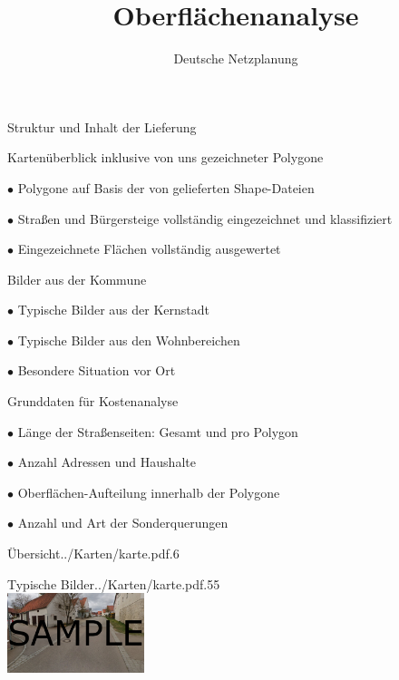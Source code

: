 \documentclass[11pt, dvipsnames,aspectratio=169]{beamer}
\author[DNP]{Deutsche Netzplanung}
\title[Oberflächenanalyse \Ort{} (\Kreis, \Land)]{\textbf{Oberflächenanalyse} \\ \Ort}
\date{\Abgabedatum}
\begin{document}
{
	\maketitle
}

\begin{frame}{Struktur und Inhalt der Lieferung \Ort}
	\begin{bulletlist}{5pt}
		\item Kartenüberblick inklusive von uns gezeichneter Polygone
			\begin{bulletlist}{3pt}
				\item[$\bullet$] Polygone auf Basis der von \Kunde{} gelieferten Shape-Dateien
				\item[$\bullet$] Straßen und Bürgersteige vollständig eingezeichnet und klassifiziert
				\item[$\bullet$] Eingezeichnete Flächen vollständig ausgewertet
			\end{bulletlist}
		\item Bilder aus der Kommune
		\begin{bulletlist}{3pt}
			\item[$\bullet$] Typische Bilder aus der Kernstadt
			\item[$\bullet$] Typische Bilder aus den Wohnbereichen
			\item[$\bullet$] Besondere Situation vor Ort
		\end{bulletlist}
		\item Grunddaten für Kostenanalyse
		\begin{bulletlist}{3pt}
			\item[$\bullet$] Länge der Straßenseiten: Gesamt und pro Polygon
			\item[$\bullet$] Anzahl Adressen und Haushalte
			\item[$\bullet$] Oberflächen-Aufteilung innerhalb der Polygone
			\item[$\bullet$] Anzahl und Art der Sonderquerungen
		\end{bulletlist}
	\end{bulletlist}
\end{frame}

\begin{mapframe}{Übersicht}{../Karten/karte.pdf}{.6\linewidth}
	\scriptsize
	\begin{itemize}
		\surfacetypes
	\end{itemize}
\end{mapframe}

\begin{mapframe}{Typische Bilder}{../Karten/karte.pdf}{.55\textwidth}
	\centering
	 \\[.3cm]
	\includegraphics[width=4cm]{../Bilder/innenstadt.png} \\
	\scriptsize \bildeins
\end{mapframe}
\end{document}
